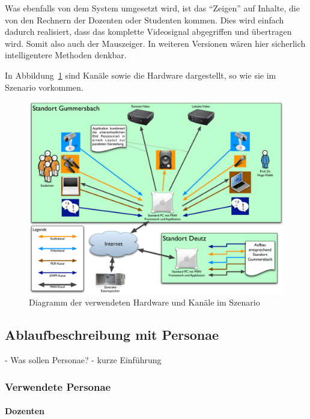   Was ebenfalls von dem System umgesetzt wird, ist das "`Zeigen"' auf Inhalte, die von den Rechnern der Dozenten oder Studenten kommen. Dies wird einfach dadurch realisiert, dass das komplette Videosignal abgegriffen und übertragen wird. Somit also auch der Mauszeiger. In weiteren Versionen wären hier sicherlich intelligentere Methoden denkbar.

  In Abbildung~\ref{fig:images_Hardware_und_Kanaele} sind Kanäle sowie die Hardware dargestellt, so wie sie im Szenario vorkommen.

\begin{figure}[ht]
  \centering
    \includegraphics[width=.9\textwidth]{images/Hardware_und_Kanaele.pdf}
  \caption{Diagramm der verwendeten Hardware und Kanäle im Szenario}
  \label{fig:images_Hardware_und_Kanaele}
\end{figure}


\subsection{Ablaufbeschreibung mit Personae} %
\label{sub:ablaufbeschreibung_mit_personae}

 - Was sollen Personae?
 - kurze Einführung
 
\subsubsection{Verwendete Personae} %
\label{ssub:verwendete_personae}

\paragraph{Dozenten} %
\label{par:dozenten}

